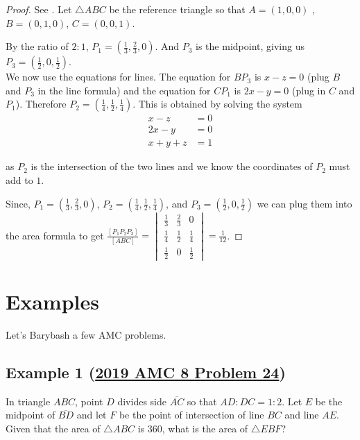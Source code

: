 \documentclass[11pt]{scrartcl}
\begin{document}
\begin{proof}
See . Let $\bigtriangleup ABC$ be the reference triangle so that $A=(1,0,0)$ , $B=(0,1,0)$, $C=(0,0,1)$.

By the ratio of $2:1$, $P_{1}=(\frac{1}{3},\frac{2}{3},0)$. And $P_3$ is the midpoint, giving us $P_3=(\frac{1}{2},0,\frac{1}{2})$.\\

We now use the equations for lines. The equation for $BP_3$ is $x-z=0$ (plug $B$ and $P_3$ in the line formula) and the equation for $CP_1$ is $2x-y=0$ (plug in $C$ and $P_1$). Therefore $P_2=(\frac{1}{4},\frac{1}{2},\frac{1}{4})$. This is obtained by solving the system 
\begin{align}
x-z&=0\\
2x-y&=0\\
x+y+z&=1
\end{align} 

as $P_2$ is the intersection of the two lines and we know the coordinates of $P_2$ must add to $1$.

Since, $P_{1}=(\frac{1}{3},\frac{2}{3},0)$, $P_2=(\frac{1}{4},\frac{1}{2},\frac{1}{4})$, and $P_3=(\frac{1}{2},0,\frac{1}{2})$ we can plug them into the area formula to get $\frac{[P_{1}P_{2}P_{3}]}{[ABC]}=\begin{vmatrix}
\frac{1}{3} &\frac{2}{3} &0 \\ 
\frac{1}{4} &\frac{1}{2} &\frac{1}{4} \\ 
\frac{1}{2}& 0 & \frac{1}{2}
\end{vmatrix}=\frac{1}{12}$.
\end{proof}



\section{Examples}
Let's Barybash a few AMC problems. 

\subsection{Example 1 (\href{https://artofproblemsolving.com/community/c5h1955385}{2019 AMC 8 Problem 24})}
\begin{problem}
    In triangle $ABC$, point $D$ divides side $\overline{AC}$ so that $AD:DC=1:2$. Let $E$ be the midpoint of $\overline{BD}$ and let $F$ be the point of intersection of line $BC$ and line $AE$. Given that the area of $\triangle ABC$ is $360$, what is the area of $\triangle EBF$?
\end{problem}
\end{document}
